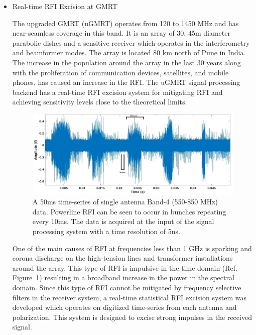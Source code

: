 \begin{itemize}
\item Real-time RFI Excision at GMRT

The upgraded GMRT (uGMRT) \cite{gupta2017upgraded} operates from 120 to 1450 MHz and has near-seamless coverage in this band. It is an array of 30, 45m diameter parabolic dishes and a sensitive receiver which operates in the interferometry and beamformer modes. The array is located 80 km north of Pune in India. The increase in the population around the array in the last 30 years along with the proliferation of communication devices, satellites, and mobile phones, has caused an increase in the RFI. The uGMRT signal processing backend has a real-time RFI excision system for mitigating RFI and achieving sensitivity levels close to the theoretical limits. \\

\begin{figure}
    \centering
    \includegraphics[scale=0.7]{Hardware Excision Techniques/figures/Band4_timeseries_ed.jpg}
    \caption{A 50ms time-series of single antenna Band-4 (550-850 MHz) data. Powerline RFI can be seen to occur in bunches repeating every 10ms. The data is acquired at the input of the signal processing system with a time resolution of 5ns.}
    \label{fig:ugmrt-b4-ts}
\end{figure}

One of the main causes of RFI at frequencies less than 1 GHz is sparking and corona discharge on the high-tension lines and transformer installations around the array. This type of RFI is impulsive in the time domain (Ref. Figure~\ref{fig:ugmrt-b4-ts}) resulting in a broadband increase in the power in the spectral domain. Since this type of RFI cannot be mitigated by frequency selective filters in the receiver system, a real-time statistical RFI excision system was developed which operates on digitized time-series from each antenna and polarization. This system is designed to excise strong impulses in the received signal. \\


\end{itemize}
